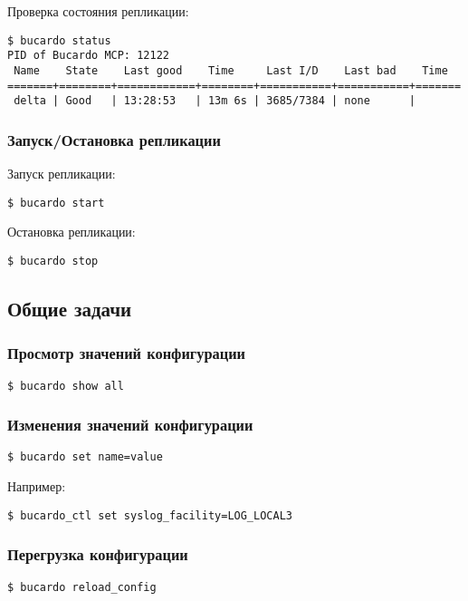 Проверка состояния репликации:

\begin{lstlisting}[label=lst:bucardo-master-slave2,caption=Проверка состояния репликации]
$ bucardo status
PID of Bucardo MCP: 12122
 Name    State    Last good    Time     Last I/D    Last bad    Time
=======+========+============+========+===========+===========+=======
 delta | Good   | 13:28:53   | 13m 6s | 3685/7384 | none      |
\end{lstlisting}

\subsubsection{Запуск/Остановка репликации}

Запуск репликации:

\begin{lstlisting}[label=lst:bucardo11,caption=Запуск репликации]
$ bucardo start
\end{lstlisting}

Остановка репликации:

\begin{lstlisting}[label=lst:bucardo12,caption=Остановка репликации]
$ bucardo stop
\end{lstlisting}

\subsection{Общие задачи}

\subsubsection{Просмотр значений конфигурации}

\begin{lstlisting}[label=lst:bucardo13,caption=Просмотр значений конфигурации]
$ bucardo show all
\end{lstlisting}

\subsubsection{Изменения значений конфигурации}

\begin{lstlisting}[label=lst:bucardo14,caption=Изменения значений конфигурациии]
$ bucardo set name=value
\end{lstlisting}

Например:

\begin{lstlisting}[label=lst:bucardo15,caption=Изменения значений конфигурации]
$ bucardo_ctl set syslog_facility=LOG_LOCAL3
\end{lstlisting}

\subsubsection{Перегрузка конфигурации}

\begin{lstlisting}[label=lst:bucardo16,caption=Перегрузка конфигурации]
$ bucardo reload_config
\end{lstlisting}
